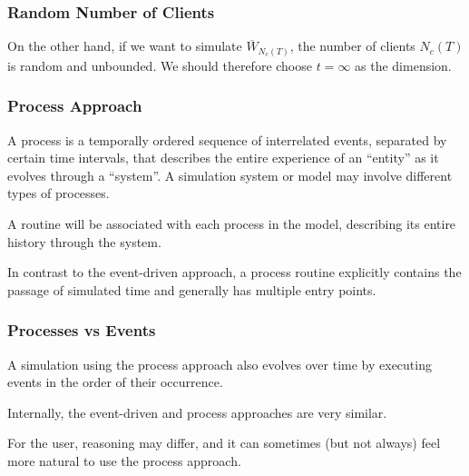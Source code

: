 \documentclass[t,usepdftitle=false,aspectratio=169]{beamer}
\begin{document}
\begin{frame}
	\frametitle{Random Number of Clients}
	
	On the other hand, if we want to simulate \(\overline{W}_{N_c(T)}\), the number of clients 
	\(N_c(T)\) is random and unbounded. 
	We should therefore choose \(t=\infty\) as the dimension.
	
\end{frame}

\begin{frame}
	\frametitle{Process Approach}
	
	A process is a temporally ordered sequence of interrelated events, separated by certain time intervals,
	that describes the entire experience of an ``entity'' as it evolves through a ``system''.
	A simulation system or model may involve different types of processes.
	
	\mbox{}
	
	A routine will be associated with each process in the model, describing its
	entire history through the system.
	
	\mbox{}
	
	In contrast to the event-driven approach, a process routine
	explicitly contains the passage of simulated time and generally has
	multiple entry points.
	
\end{frame}

\begin{frame}
	\frametitle{Processes vs Events}
	
	A simulation using the process approach also evolves over time by executing events in the order of their occurrence.
	
	\mbox{}
	
	Internally, the event-driven and process approaches are very similar.
	
	\mbox{}
	
	For the user, reasoning may differ, and it can sometimes (but not always) feel more natural to use the process approach.
	
	
	
\end{frame}
\end{document}
